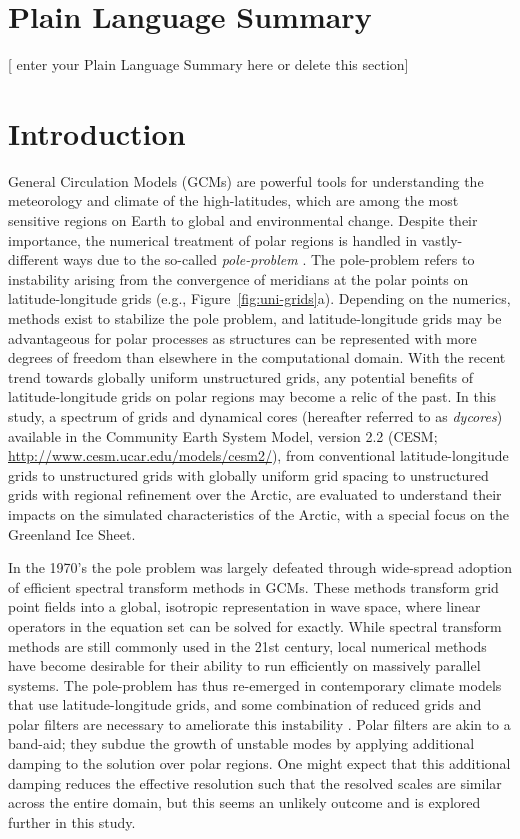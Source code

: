 \documentclass[draft]{agujournal2019}
\begin{document}
\section*{Plain Language Summary}
[ enter your Plain Language Summary here or delete this section]


%
%

\section{Introduction}

General Circulation Models (GCMs) are powerful tools for understanding the meteorology and climate of the high-latitudes, which are among the most sensitive regions on Earth to global and environmental change. Despite their importance, the numerical treatment of polar regions is handled in vastly-different ways due to the so-called \textit{pole-problem} \cite{W2007JMSJ}. The pole-problem refers to instability arising from the convergence of meridians at the polar points on latitude-longitude grids (e.g., Figure~\ref{fig:uni-grids}a). Depending on the numerics, methods exist to stabilize the pole problem, and latitude-longitude grids may be advantageous for polar processes as structures can be represented with more degrees of freedom than elsewhere in the computational domain. With the recent trend towards globally uniform unstructured grids, any potential benefits of latitude-longitude grids on polar regions may become a relic of the past. In this study, a spectrum of grids and dynamical cores (hereafter referred to as \textit{dycores}) available in the Community Earth System Model, version 2.2 (CESM; \url{http://www.cesm.ucar.edu/models/cesm2/}), from conventional latitude-longitude grids to unstructured grids with globally uniform grid spacing to unstructured grids with regional refinement over the Arctic, are evaluated to understand their impacts on the simulated characteristics of the Arctic, with a special focus on the Greenland Ice Sheet.

In the 1970's the pole problem was largely defeated through wide-spread adoption of efficient spectral transform methods in GCMs. These methods transform grid point fields into a global, isotropic representation in wave space, where linear operators in the equation set can be solved for exactly. While spectral transform methods are still commonly used in the 21st century, local numerical methods have become desirable for their ability to run efficiently on massively parallel systems. The pole-problem has thus re-emerged in contemporary climate models that use latitude-longitude grids, and some combination of reduced grids and polar filters are necessary to ameliorate this instability \cite{JW2010LNCSE}. Polar filters are akin to a band-aid; they subdue the growth of unstable modes by applying additional damping to the solution over polar regions. One might expect that this additional damping reduces the effective resolution such that the resolved scales are similar across the entire domain, but this seems an unlikely outcome and is explored further in this study.
\end{document}
